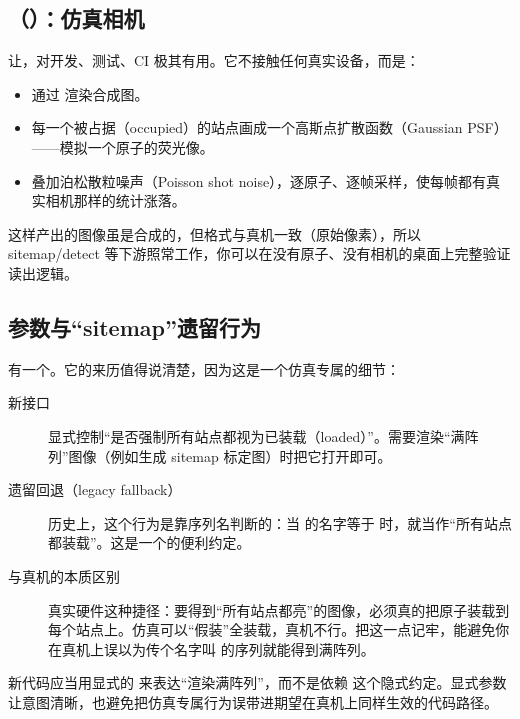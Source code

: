 \documentclass[11pt,oneside,openany]{book}
\begin{document}
\subsection{（）：仿真相机}

 让，对开发、测试、CI 极其有用。它不接触任何真实设备，而是：

\begin{itemize}
\item 通过  渲染合成图。
\item 每一个被占据（occupied）的站点画成一个高斯点扩散函数（Gaussian PSF）——模拟一个原子的荧光像。
\item 叠加泊松散粒噪声（Poisson shot noise），逐原子、逐帧采样，使每帧都有真实相机那样的统计涨落。
\end{itemize}

这样产出的图像虽是合成的，但格式与真机一致（原始像素），所以 sitemap/detect 等下游照常工作，你可以在没有原子、没有相机的桌面上完整验证读出逻辑。

\subsection{ 参数与“sitemap”遗留行为}

 有一个。它的来历值得说清楚，因为这是一个仿真专属的细节：

\begin{description}
\item[新接口]  显式控制“是否强制所有站点都视为已装载（loaded）”。需要渲染“满阵列”图像（例如生成 sitemap 标定图）时把它打开即可。
\item[遗留回退（legacy fallback）] 历史上，这个行为是靠序列名判断的：当  的名字等于  时，就当作“所有站点都装载”。这是一个的便利约定。
\item[与真机的本质区别] 真实硬件这种捷径：要得到“所有站点都亮”的图像，必须真的把原子装载到每个站点上。仿真可以“假装”全装载，真机不行。把这一点记牢，能避免你在真机上误以为传个名字叫  的序列就能得到满阵列。
\end{description}

\begin{notebox}[迁移提示]
新代码应当用显式的  来表达“渲染满阵列”，而不是依赖  这个隐式约定。显式参数让意图清晰，也避免把仿真专属行为误带进期望在真机上同样生效的代码路径。
\end{notebox}
\end{document}
